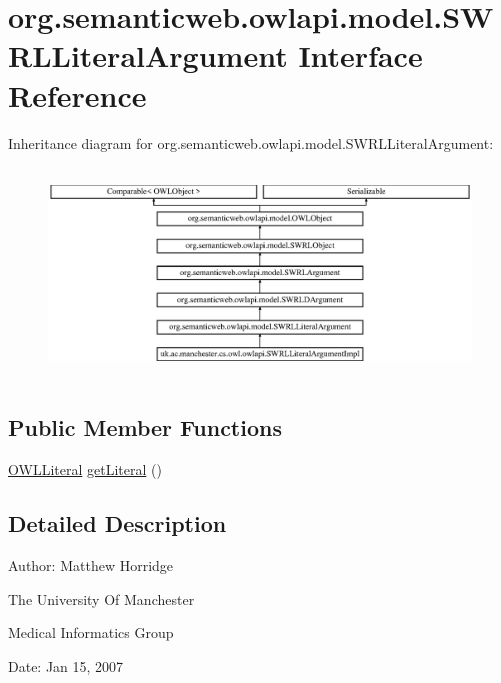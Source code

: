 \hypertarget{interfaceorg_1_1semanticweb_1_1owlapi_1_1model_1_1_s_w_r_l_literal_argument}{\section{org.\-semanticweb.\-owlapi.\-model.\-S\-W\-R\-L\-Literal\-Argument Interface Reference}
\label{interfaceorg_1_1semanticweb_1_1owlapi_1_1model_1_1_s_w_r_l_literal_argument}
}
Inheritance diagram for org.\-semanticweb.\-owlapi.\-model.\-S\-W\-R\-L\-Literal\-Argument\-:\begin{figure}[H]
\begin{center}
\leavevmode
\includegraphics[height=5.616045cm]{interfaceorg_1_1semanticweb_1_1owlapi_1_1model_1_1_s_w_r_l_literal_argument}
\end{center}
\end{figure}
\subsection*{Public Member Functions}
\begin{DoxyCompactItemize}
\item 
\hyperlink{interfaceorg_1_1semanticweb_1_1owlapi_1_1model_1_1_o_w_l_literal}{O\-W\-L\-Literal} \hyperlink{interfaceorg_1_1semanticweb_1_1owlapi_1_1model_1_1_s_w_r_l_literal_argument_a4064982d27a6619b391c423b318376cf}{get\-Literal} ()
\end{DoxyCompactItemize}


\subsection{Detailed Description}
Author\-: Matthew Horridge\par
 The University Of Manchester\par
 Medical Informatics Group\par
 Date\-: Jan 15, 2007\par
\par
 

